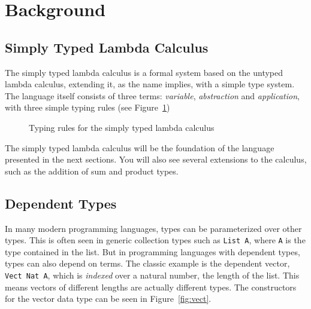\section{Background}
\label{sec:background}

\subsection{Simply Typed Lambda Calculus}
\label{sec:stlc}
The simply typed lambda calculus is a formal system based on the untyped lambda calculus, extending it, as the name implies, with a simple type system. The language itself consists of three terms: \emph{variable}, \emph{abstraction} and \emph{application}, with three simple typing rules (see Figure~\ref{fig:simple-typing-rules})\,\cite[Chapter 9]{Pierce:TypeSystems} 
\begin{center}
\begin{figure}
\begin{prooftree}
\end{prooftree}
\begin{prooftree}
\end{prooftree}
\begin{prooftree}
\end{prooftree}
\label{fig:simple-typing-rules}
\caption{Typing rules for the simply typed lambda calculus}
\end{figure}
\end{center}
The simply typed lambda calculus will be the foundation of the language presented in the next sections. You will also see several extensions to the calculus, such as the addition of sum and product types.

\subsection{Dependent Types}
\label{sec:dependent-types-idris}
In many modern programming languages, types can be parameterized over other types. This is often seen in generic collection types such as \texttt{List A}, where \texttt{A} is the type contained in the list. But in programming languages with dependent types, types can also depend on terms. The classic example is the dependent vector, \texttt{Vect Nat A}, which is \emph{indexed} over a natural number, the length of the list. This means vectors of different lengths are actually different types. The constructors for the vector data type can be seen in Figure~\ref{fig:vect}.

